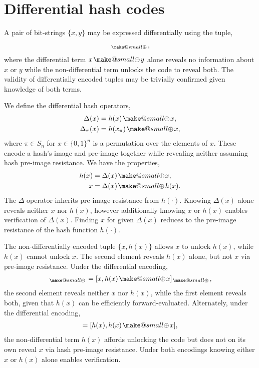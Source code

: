 \documentclass[twocolumn, aps, amsmath, amssymb, nofootinbib, superscriptaddress, longbibliography, doublefloatfix, table-of-contents, eqsecnum, rmp]{revtex4-2}
\makeatletter
\newcommand{\soplus}{{{\hspace{1pt}}{\mathbin{\mathpalette\make@small\oplus}}}{\hspace{1pt}}}
\newcommand{\make@small}[2]{%
  \vcenter{\hbox{%
    \scalebox{0.6}{$\m@th#1#2$}%
  }}%
}
\makeatother
\begin{document}
\section{Differential hash codes}

A pair of bit-strings $\{x,y\}$ may be expressed differentially using the tuple,
\begin{align}
	[x,x\soplus y]_\soplus,
\end{align}
where the differential term $x\soplus y$ alone reveals no information about $x$ or $y$ while the non-differential term unlocks the code to reveal both. The validity of differentially encoded tuples may be trivially confirmed given knowledge of both terms.

We define the differential hash operators,
\begin{align}
	\Delta(x) &= h(x)\soplus x,\nonumber\\
	\Delta_\pi(x) &= h(x_\pi)\soplus x,
\end{align}
where $\pi\in S_n$ for $x\in\{0,1\}^n$ is a permutation over the elements of $x$. These encode a hash's image and pre-image together while revealing neither assuming hash pre-image resistance. We have the properties,
\begin{align}
	h(x) &= \Delta(x) \soplus x,\nonumber\\
	x &= \Delta(x) \soplus h(x).
\end{align}
The $\Delta$ operator inherits pre-image resistance from $h(\cdot)$. Knowing $\Delta(x)$ alone reveals neither $x$ nor $h(x)$, however additionally knowing $x$ or $h(x)$ enables verification of $\Delta(x)$. Finding $x$ for given $\Delta(x)$ reduces to the pre-image resistance of the hash function $h(\cdot)$.

The non-differentially encoded tuple $\{x,h(x)\}$ allows $x$ to unlock $h(x)$, while $h(x)$ cannot unlock $x$. The second element reveals $h(x)$ alone, but not $x$ via pre-image resistance. Under the differential encoding,
\begin{align}
	[x,\Delta(x)]_\soplus =[x,h(x)\soplus x]_\soplus,
\end{align}
the second element reveals neither $x$ nor $h(x)$, while the first element reveals both, given that $h(x)$ can be efficiently forward-evaluated. Alternately, under the differential encoding,
\begin{align}
	[h(x),\Delta(x)] = [h(x),h(x)\soplus x],
\end{align}
the non-differential term $h(x)$ affords unlocking the code but does not on its own reveal $x$ via hash pre-image resistance. Under both encodings knowing either $x$ or $h(x)$ alone enables verification.
\end{document}
